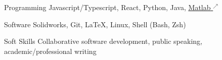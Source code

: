 

\begin{cvskills}

  \cvskill
    {Programming} %
    {Javascript/Typescript, React, Python, Java, \href{https://matlabacademy.mathworks.com/progress/share/certificate.html?id=0b956720-4cf6-4f3b-a359-9b8cf4a89450&}{\underline{Matlab} $^↗$}} %

    \cvskill
    {Software} %
    {Solidworks, Git, \LaTeX, Linux, Shell (Bash, Zsh)} %

  \cvskill
    {Soft Skills} %
    {Collaborative software development, public speaking, academic/professional writing} %
\end{cvskills}
